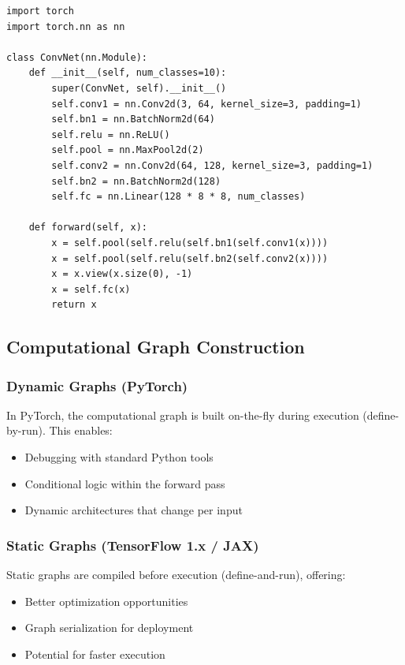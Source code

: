 \documentclass[11pt]{article}
\begin{document}
\lstset{style=pythonstyle}
\begin{lstlisting}[caption=PyTorch CNN Example, label=lst:pytorch]
import torch
import torch.nn as nn

class ConvNet(nn.Module):
    def __init__(self, num_classes=10):
        super(ConvNet, self).__init__()
        self.conv1 = nn.Conv2d(3, 64, kernel_size=3, padding=1)
        self.bn1 = nn.BatchNorm2d(64)
        self.relu = nn.ReLU()
        self.pool = nn.MaxPool2d(2)
        self.conv2 = nn.Conv2d(64, 128, kernel_size=3, padding=1)
        self.bn2 = nn.BatchNorm2d(128)
        self.fc = nn.Linear(128 * 8 * 8, num_classes)
    
    def forward(self, x):
        x = self.pool(self.relu(self.bn1(self.conv1(x))))
        x = self.pool(self.relu(self.bn2(self.conv2(x))))
        x = x.view(x.size(0), -1)
        x = self.fc(x)
        return x
\end{lstlisting}

\subsection{Computational Graph Construction}

\subsubsection{Dynamic Graphs (PyTorch)}
In PyTorch, the computational graph is built on-the-fly during execution (define-by-run). This enables:
\begin{itemize}
    \item Debugging with standard Python tools
    \item Conditional logic within the forward pass
    \item Dynamic architectures that change per input
\end{itemize}

\subsubsection{Static Graphs (TensorFlow 1.x / JAX)}
Static graphs are compiled before execution (define-and-run), offering:
\begin{itemize}
    \item Better optimization opportunities
    \item Graph serialization for deployment
    \item Potential for faster execution
\end{itemize}
\end{document}
